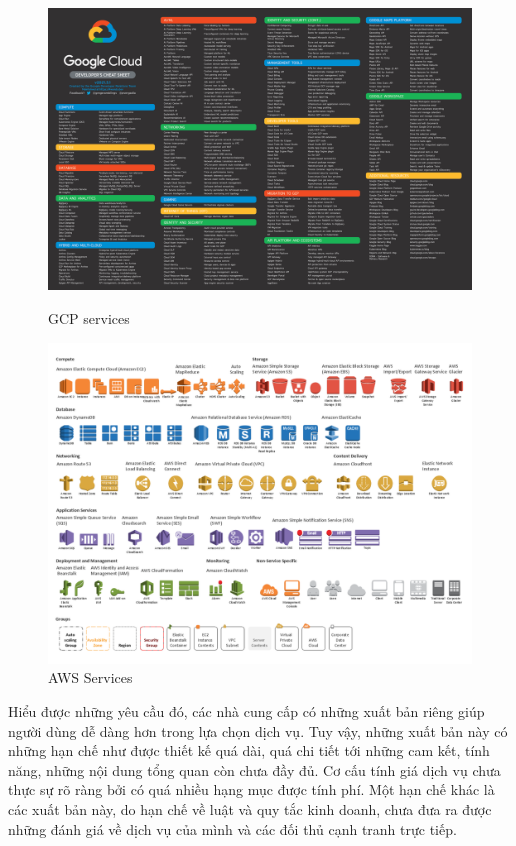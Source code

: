 \documentclass{article}
\begin{document}
\begin{figure}[!htb]
  \begin{minipage}{0.48\textwidth}
    \centering
    \includegraphics[width=.7\linewidth]{imgs/gcp_services.jpg}
    \caption{GCP services}\label{Fig:gcp_services}
  \end{minipage}\hfill
  \begin{minipage}{0.48\textwidth}
    \centering
    \includegraphics[width=.7\linewidth]{imgs/aws-toolkit.png}
    \caption{AWS Services}\label{Fig:aws_services}
  \end{minipage}
\end{figure}

Hiểu được những yêu cầu đó, các nhà cung cấp có những xuất bản riêng \cite{geewax2018google, wittig2018amazon} giúp người dùng dễ dàng hơn trong lựa chọn dịch vụ. Tuy vậy, những xuất bản này có những hạn chế như được thiết kế quá dài, quá chi tiết tới những cam kết, tính năng, những nội dung tổng quan còn chưa đầy đủ. Cơ cấu tính giá dịch vụ chưa thực sự rõ ràng bởi có quá nhiều hạng mục được tính phí. Một hạn chế khác là các xuất bản này, do hạn chế về luật và quy tắc kinh doanh, chưa đưa ra được những đánh giá về dịch vụ của mình và các đối thủ cạnh tranh trực tiếp. \\
\end{document}
